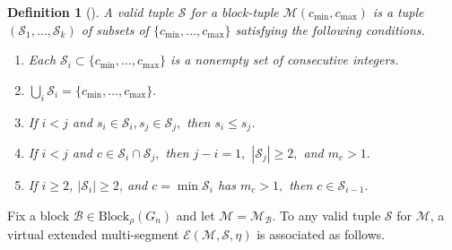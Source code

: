 \documentclass[11pt,letterpaper]{amsart}
\newcommand{\B}{{\mathcal B}}
\newcommand{\Block}{\mathrm{Block}}
\newtheorem{defn}[thm]{Definition}
\numberwithin{equation}{section}
\begin{document}
\begin{defn}[{\cite[Definition 5.1]{HKT26}}]
\label{valid S}
    A \emph{valid} tuple $\mathcal{S}$ for a block-tuple $\mathcal{M}(c_{\min},c_{\max})$ is a tuple $(\mathcal{S}_1, \dots, \mathcal{S}_k)$ of subsets of $\{c_{\min}, \dots, c_{\max}\}$ satisfying the following conditions.
    \begin{enumerate} 
        \item Each $\mathcal{S}_i \subset \{c_{\min}, \dots, c_{\max} \}$ is a nonempty set of consecutive integers.
        \item $\bigcup_i \mathcal{S}_i = \{c_{\min}, \dots, c_{\max}\}.$
        \item If $i < j$ and $s_i \in \mathcal{S}_i, s_j \in \mathcal{S}_j,$ then $s_i \leq s_j$.
        \item If $i < j$ and $c \in \mathcal{S}_i \cap \mathcal{S}_j,$ then $j - i = 1,$ $|\mathcal{S}_j| \geq 2,$ and $m_c > 1.$
        \item If $i\geq 2$, $|\mathcal{S}_i| \geq 2$, and $c = \min \mathcal{S}_i$ has $m_c > 1,$ then $c \in \mathcal{S}_{i - 1}.$
\end{enumerate}
\end{defn}

Fix a block $\B\in\Block_\rho(G_n)$ and let $\mathcal{M}=\mathcal{M}_\B.$
To any valid tuple $\mathcal{S}$ for $\mathcal{M}$, a virtual extended multi-segment $\mathcal{E}(\mathcal{M}, \mathcal{S}, \eta)$ is associated as follows.
\end{document}
